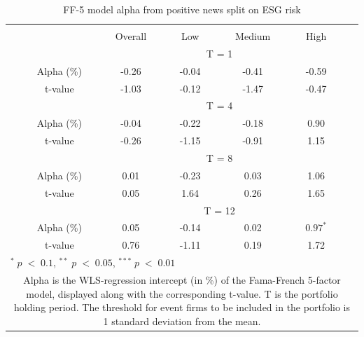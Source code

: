 \setlength{\tabcolsep}{15pt}
\begin{table}[H]
\small
\centering
\caption{FF-5 model alpha from positive news split on ESG risk} 
\begin{tabular}{ccccccc}
\hline \hline \\  
 &     & Overall  &    Low  &  Medium  &  High  &  \\ \cline{3-6} 
& & \multicolumn{4}{c}{ T = 1} & \\ \cline{2-6}
& Alpha (\%)  & -0.26 & -0.04  & -0.41  & -0.59 &  \\
& t-value & -1.03 & -0.12 & -1.47  & -0.47 & \\
& &  \multicolumn{4}{c}{ T = 4} & \\ \cline{2-6}
& Alpha (\%)  & -0.04 & -0.22  & -0.18  &  0.90 & \\
& t-value & -0.26 & -1.15 & -0.91  & 1.15 & \\
& &  \multicolumn{4}{c}{ T = 8} & \\ \cline{2-6}
& Alpha (\%)  & 0.01 & -0.23   & 0.03  & 1.06 &  \\
& t-value & 0.05 & 1.64  & 0.26 & 1.65 & \\
&  &  \multicolumn{4}{c}{ T = 12} & \\ \cline{2-6}
& Alpha (\%)  & 0.05 & -0.14  & 0.02  & $0.97^{*}$ &  \\
& t-value & 0.76 & -1.11  & 0.19 & 1.72 & \\
\hline \hline
 \multicolumn{7}{l}{ \footnotesize $^* \; p\; <\; 0.1$, $ ^{**} \; p\; <\; 0.05$, $ ^{***} \; p\; <\; 0.01$  } \\
 \multicolumn{7}{p{12cm}}{ \footnotesize Alpha is the WLS-regression intercept (in \%) of the Fama-French 5-factor model, displayed along with the corresponding t-value. T is the portfolio holding period. The threshold for event firms to be included in the portfolio is 1 standard deviation from the mean.}  \\ 
\end{tabular}
\label{tab: FF5_pos_ESG}
\end{table}
